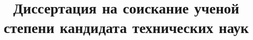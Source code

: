 \documentclass[candidate,subf,href,colorlinks=true
]{disser}
\begin{document}

\title{Диссертация на соискание ученой степени кандидата технических наук\\}
\maketitle
%
%
%
%
%
%
%
%
%
%
\tableofcontents

%
%
% 
\appendix
%
\end{document}
